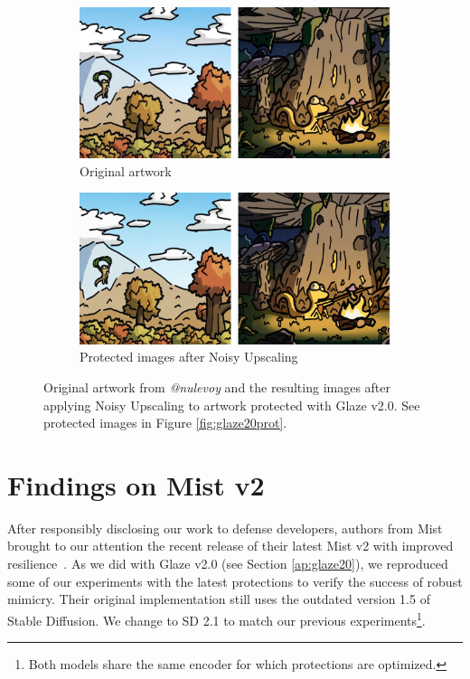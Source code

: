 \documentclass{article}
\begin{document}
\begin{figure}[h]
    \centering
        \begin{subfigure}[b]{0.49\textwidth}
         \centering
         \includegraphics[width=\textwidth]{plots/nulevoy-original.pdf}
         \caption{Original artwork}
     \end{subfigure}
     \hfill
     \begin{subfigure}[b]{0.49\textwidth}
         \centering
         \includegraphics[width=\textwidth]{plots/Glaze20Upscaled.pdf}
         \caption{Protected images after Noisy Upscaling}
     \end{subfigure}
    \caption{Original artwork from \emph{@nulevoy} and the resulting images after applying Noisy Upscaling to artwork protected with Glaze v2.0. See protected images in Figure \ref{fig:glaze20prot}.}
    \label{fig:glaze20preproc}
\end{figure}

\section{Findings on Mist v2}
\label{ap:mist20}

After responsibly disclosing our work to defense developers, authors from Mist brought to our attention the recent release of their latest Mist v2 with improved resilience~\citep{zheng2023understanding}. As we did with Glaze v2.0 (see Section \ref{ap:glaze20}), we reproduced some of our experiments with the latest protections to verify the success of robust mimicry. Their original implementation still uses the outdated version 1.5 of Stable Diffusion. We change to SD 2.1 to match our previous experiments\footnote{Both models share the same encoder for which protections are optimized.}.
\end{document}
